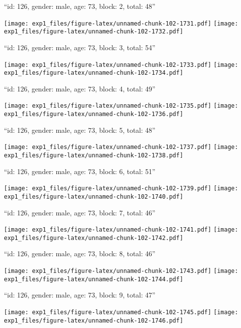\documentclass[11pt,,]{article}
\begin{document}
\newpage
[1] 

``id: 126, gender: male, age: 73, block: 2, total: 48''

\texttt{[image: exp1\_files/figure-latex/unnamed-chunk-102-1731.pdf]}
\texttt{[image: exp1\_files/figure-latex/unnamed-chunk-102-1732.pdf]}

\newpage
[1] 

``id: 126, gender: male, age: 73, block: 3, total: 54''

\texttt{[image: exp1\_files/figure-latex/unnamed-chunk-102-1733.pdf]}
\texttt{[image: exp1\_files/figure-latex/unnamed-chunk-102-1734.pdf]}

\newpage
[1] 

``id: 126, gender: male, age: 73, block: 4, total: 49''

\texttt{[image: exp1\_files/figure-latex/unnamed-chunk-102-1735.pdf]}
\texttt{[image: exp1\_files/figure-latex/unnamed-chunk-102-1736.pdf]}

\newpage
[1] 

``id: 126, gender: male, age: 73, block: 5, total: 48''

\texttt{[image: exp1\_files/figure-latex/unnamed-chunk-102-1737.pdf]}
\texttt{[image: exp1\_files/figure-latex/unnamed-chunk-102-1738.pdf]}

\newpage
[1] 

``id: 126, gender: male, age: 73, block: 6, total: 51''

\texttt{[image: exp1\_files/figure-latex/unnamed-chunk-102-1739.pdf]}
\texttt{[image: exp1\_files/figure-latex/unnamed-chunk-102-1740.pdf]}

\newpage
[1] 

``id: 126, gender: male, age: 73, block: 7, total: 46''

\texttt{[image: exp1\_files/figure-latex/unnamed-chunk-102-1741.pdf]}
\texttt{[image: exp1\_files/figure-latex/unnamed-chunk-102-1742.pdf]}

\newpage
[1] 

``id: 126, gender: male, age: 73, block: 8, total: 46''

\texttt{[image: exp1\_files/figure-latex/unnamed-chunk-102-1743.pdf]}
\texttt{[image: exp1\_files/figure-latex/unnamed-chunk-102-1744.pdf]}

\newpage
[1] 

``id: 126, gender: male, age: 73, block: 9, total: 47''

\texttt{[image: exp1\_files/figure-latex/unnamed-chunk-102-1745.pdf]}
\texttt{[image: exp1\_files/figure-latex/unnamed-chunk-102-1746.pdf]}
\end{document}
